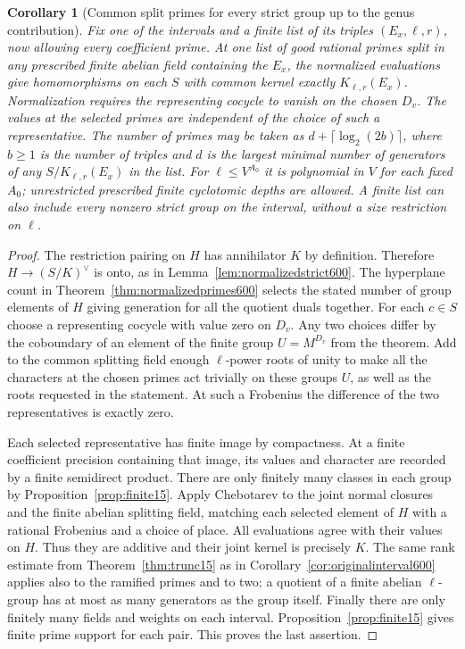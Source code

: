 \documentclass[a4paper,11pt]{article}
\newtheorem{corollary}[proposition]{Corollary}
\theoremstyle{definition}
\theoremstyle{remark}
\numberwithin{equation}{section}
\begin{document}
\begin{corollary}[Common split primes for every strict group up to the genus contribution]
\leavevmode\label{cor:allprimesstrict601}
Fix one of the intervals and a finite list of its triples
\((E_x,\ell,r)\), now allowing every coefficient prime.
At one list of good rational primes split in any prescribed
finite abelian field containing the \(E_x\), the normalized
evaluations give homomorphisms on each \(S\) with common
kernel exactly \(K_{\ell,r}(E_x)\). Normalization requires
the representing cocycle to vanish on the chosen \(D_v\).
The values at the selected primes are independent of
the choice of such a representative. The number of primes
may be taken as \(d+\lceil\log_2(2b)\rceil\), where
\(b\ge1\) is the number of triples and \(d\) is the largest
minimal number of generators of any \(S/K_{\ell,r}(E_x)\)
in the list. For \(\ell\le V^{A_0}\) it is polynomial
in \(V\) for each fixed \(A_0\); unrestricted prescribed
finite cyclotomic depths are allowed. A finite list can
also include every nonzero strict group on the interval,
without a size restriction on \(\ell\).
\end{corollary}
\begin{proof}
The restriction pairing on \(H\) has annihilator \(K\)
by definition. Therefore \(H\to(S/K)^\vee\) is onto,
as in Lemma~\ref{lem:normalizedstrict600}. The hyperplane
count in Theorem~\ref{thm:normalizedprimes600} selects
the stated number of group elements of \(H\) giving
generation for all the quotient duals together.
For each \(c\in S\) choose a representing cocycle with
value zero on \(D_v\). Any two choices differ by the
coboundary of an element of the finite group \(U=M^{D_v}\)
from the theorem. Add to the common splitting field
enough \(\ell\)-power roots of unity to make all the
characters at the chosen primes act trivially on these
groups \(U\), as well as the roots requested in the
statement. At such a Frobenius the difference of the two
representatives is exactly zero.

Each selected representative has finite image by compactness.
At a finite coefficient precision containing that image,
its values and character are recorded by a finite
semidirect product. There are only finitely many classes
in each group by Proposition~\ref{prop:finite15}. Apply
Chebotarev to the joint normal closures and the finite
abelian splitting field, matching each selected element
of \(H\) with a rational Frobenius and a choice of place.
All evaluations agree with their values on \(H\). Thus
they are additive and their joint kernel is precisely
\(K\). The same rank estimate from
Theorem~\ref{thm:trunc15} as in
Corollary~\ref{cor:originalinterval600} applies also
to the ramified primes and to two; a quotient of a
finite abelian \(\ell\)-group has at most as many
generators as the group itself. Finally there are only
finitely many fields and weights on each interval.
Proposition~\ref{prop:finite15} gives finite prime support
for each pair. This proves the last assertion.
\end{proof}
\end{document}
